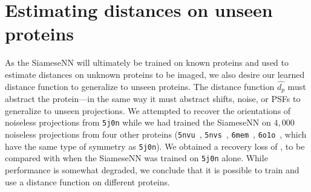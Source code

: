 \section{Estimating distances on unseen proteins}\label{apx:unseen-proteins}

As the SiameseNN will ultimately be trained on known proteins and used to estimate distances on unknown proteins to be imaged,
we also desire our learned distance function to generalize to unseen proteins.
The distance function $\widehat{d_p}$ must abstract the protein---in the same way it must abstract shifts, noise, or PSFs to generalize to unseen projections.
We attempted to recover the orientations of noiseless projections from \texttt{5j0n} while we had trained the SiameseNN on $4,000$ noiseless projections from four other proteins (\texttt{5nvu}~\cite{ZHANG20171303}, \texttt{5nvs}~\cite{ZHANG20171303}, \texttt{6mem}~\cite{iwai2018unique}, \texttt{6o1o}~\cite{liu2019target}, which have the same type of symmetry as \texttt{5j0n}).
We obtained a recovery loss of ,
to be compared with  when the SiameseNN was trained on \texttt{5j0n} alone.
While performance is somewhat degraded, we conclude that it is possible to train and use a distance function on different proteins.


